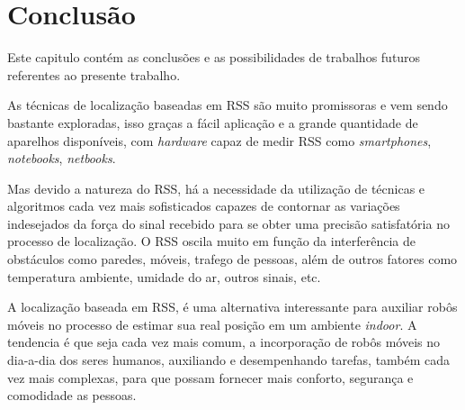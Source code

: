 \chapter{Conclusão}
\label{conclusao}
\begin{comment}
  Os robôs vem sendo muito utilizados na automatização de tarefas, e nesse trabalho 
  podemos perceber que  uma tarefa simples, como deslocar um robô de um lugar a outro, 
  de forma autônoma, exige técnicas complexas de estatística e de várias áreas da 
  computação como inteligência artificial, geometria computacional e processamento de 
  imagens.
  
    O conceito por trás desse trabalho é muito promissor, pois, a idéia de poder clicar em um mapa, ou falar o endereço onde você deseja ir,
    e seu celular ou tablet dirige seu carro para você, sem precisar tocar no volante, é extremamente interessante.
\end{comment}
    Este capitulo contém as conclusões e as possibilidades de trabalhos futuros referentes ao presente 
    trabalho.
  
   As técnicas de localização baseadas em RSS são muito promissoras e 
  vem sendo bastante exploradas, isso graças a fácil aplicação e a grande 
  quantidade de aparelhos disponíveis, 
  com \textit{hardware} capaz de medir RSS como \textit{smartphones}, \textit{notebooks}, \textit{netbooks}.
  
   Mas devido a natureza do RSS, há a necessidade da utilização de técnicas e 
  algoritmos cada vez mais sofisticados capazes de contornar as variações indesejados
  da força do sinal recebido para se obter uma precisão satisfatória no processo de 
  localização. O RSS oscila muito em função da interferência 
   de obstáculos como paredes, 
   móveis, trafego de pessoas, além de outros fatores como temperatura ambiente, 
   umidade do ar, outros sinais, etc.
  
   A localização baseada em RSS, é uma alternativa interessante para auxiliar robôs móveis
   no processo de estimar sua real posição em um ambiente \textit{indoor}. A tendencia é que 
   seja cada vez mais comum, a incorporação de robôs móveis no dia-a-dia dos seres humanos,
   auxiliando e desempenhando tarefas, também cada vez mais complexas, para que possam 
   fornecer mais conforto, segurança e comodidade as pessoas.
   
